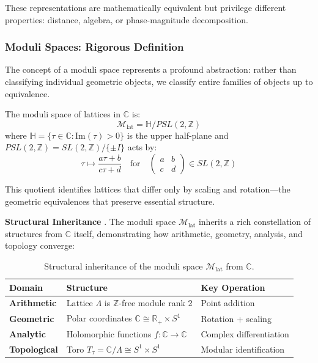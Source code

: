     These representations are mathematically equivalent but privilege different properties: distance, algebra, or phase-magnitude decomposition.

    \subsubsection{Moduli Spaces: Rigorous Definition}

    The concept of a moduli space represents a profound abstraction: rather than classifying individual geometric objects, we classify entire families of objects up to equivalence.

    \begin{Definition} \label{def:moduli-space-lattices}
        The moduli space of lattices in $\mathbb{C}$ is:
        \[
            \mathcal{M}_{\text{lat}} = \mathbb{H}/PSL(2,\mathbb{Z})
        \]
        where $\mathbb{H} = \{\tau \in \mathbb{C} : \text{Im}(\tau) > 0\}$ is the upper half-plane and $PSL(2,\mathbb{Z}) = SL(2,\mathbb{Z})/\{\pm I\}$ acts by:
        \[
            \tau \mapsto \frac{a\tau+b}{c\tau+d} \quad \text{for} \quad \begin{pmatrix} a & b \\ c & d \end{pmatrix} \in SL(2,\mathbb{Z})
        \]
    \end{Definition}

    This quotient identifies lattices that differ only by scaling and rotation—the geometric equivalences that preserve essential structure.

    \textbf{Structural Inheritance} \label{sec:moduli-lattice}. The moduli space $\mathcal{M}_{\text{lat}}$ inherits a rich constellation of structures from $\mathbb{C}$ itself, demonstrating how arithmetic, geometry, analysis, and topology converge:

    \begin{table}[h]
        \centering
        \begin{tabular}{lll}
            \hline
            \textbf{Domain}      & \textbf{Structure}                                           & \textbf{Key Operation}  \\ \hline
            \textbf{Arithmetic}  & Lattice $\Lambda$ is $\mathbb{Z}$-free module rank 2         & Point addition          \\
            \textbf{Geometric}   & Polar coordinates $\mathbb{C} \cong \mathbb{R}_+ \times S^1$ & Rotation + scaling      \\
            \textbf{Analytic}    & Holomorphic functions $f: \mathbb{C} \to \mathbb{C}$         & Complex differentiation \\
            \textbf{Topological} & Toro $T_\tau = \mathbb{C}/\Lambda \cong S^1 \times S^1$      & Modular identification  \\ \hline
        \end{tabular}
        \caption{Structural inheritance of the moduli space $\mathcal{M}_{\text{lat}}$ from $\mathbb{C}$.}
    \end{table}

